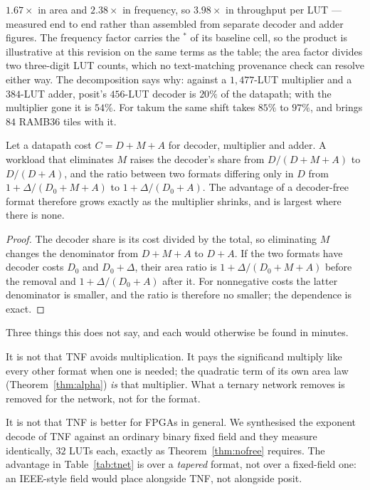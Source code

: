 $1.67\times$ in area and $2.38\times$ in frequency, so $3.98\times$ in throughput
per LUT --- measured end to end rather than assembled from separate decoder and
adder figures. The frequency factor carries the $^{\ast}$ of its baseline cell, so
the product is illustrative at this revision on the same terms as the table; the
area factor divides two three-digit LUT counts, which no text-matching provenance
check can resolve either way. The decomposition says why: against a $1{,}477$-LUT multiplier and
a $384$-LUT adder, posit's $456$-LUT decoder is $20\%$ of the datapath; with the
multiplier gone it is $54\%$. For takum the same shift takes $85\%$ to $97\%$, and
brings $84$ RAMB36 tiles with it.

\begin{corollary}
\label{cor:promote}
Let a datapath cost $C = D + M + A$ for decoder, multiplier and adder. A workload
that eliminates $M$ raises the decoder's share from $D/(D{+}M{+}A)$ to
$D/(D{+}A)$, and the ratio between two formats differing only in $D$ from
$1 + \Delta/(D_0{+}M{+}A)$ to $1 + \Delta/(D_0{+}A)$. The advantage of a
decoder-free format therefore grows exactly as the multiplier shrinks, and is
largest where there is none.
\end{corollary}
\begin{proof}
The decoder share is its cost divided by the total, so eliminating $M$ changes
the denominator from $D+M+A$ to $D+A$.  If the two formats have decoder costs
$D_0$ and $D_0+\Delta$, their area ratio is
$1+\Delta/(D_0+M+A)$ before the removal and
$1+\Delta/(D_0+A)$ after it.  For nonnegative costs the latter denominator is
smaller, and the ratio is therefore no smaller; the dependence is exact.
\end{proof}

Three things this does not say, and each would otherwise be found in minutes.

It is not that TNF avoids multiplication. It pays the significand multiply like
every other format when one is needed; the quadratic term of its own area law
(Theorem~\ref{thm:alpha}) \emph{is} that multiplier. What a ternary network removes
is removed for the network, not for the format.

It is not that TNF is better for FPGAs in general. We synthesised the exponent
decode of TNF against an ordinary binary fixed field and they measure identically,
$32$ LUTs each, exactly as Theorem~\ref{thm:nofree} requires. The advantage in
Table~\ref{tab:tnet} is over a \emph{tapered} format, not over a fixed-field one:
an IEEE-style field would place alongside TNF, not alongside posit.

